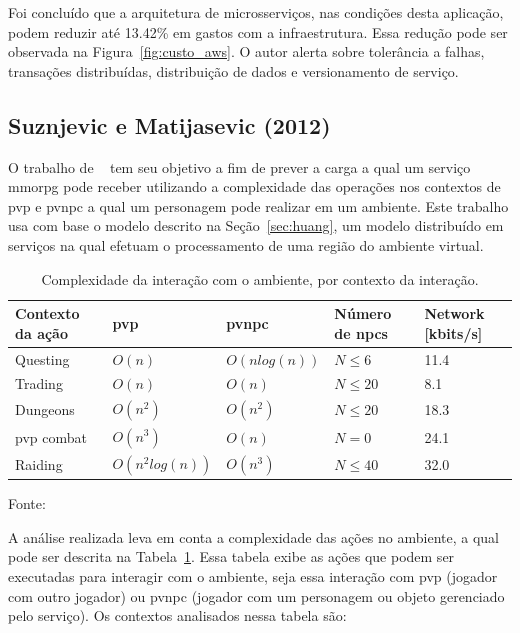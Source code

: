 Foi concluído que a arquitetura de microsserviços, nas condições desta aplicação, podem reduzir até 13.42\% em gastos com a infraestrutura.
%
Essa redução pode ser observada na Figura~\ref{fig:custo_aws}.
%
O autor alerta sobre tolerância a falhas, transações distribuídas, distribuição de dados e versionamento de serviço.


\subsection{Suznjevic e Matijasevic (2012)}



O trabalho de ~\cite{6374456} tem seu objetivo a fim de prever a carga a qual um serviço \ac{mmorpg} pode receber utilizando a complexidade das operações nos contextos de \ac{pvp} e \ac{pvnpc} a qual um personagem pode realizar em um ambiente.
%
Este trabalho usa com base o modelo descrito na Seção~\ref{sec:huang}, um modelo distribuído em serviços na qual efetuam o processamento de uma região do ambiente virtual.



\begin{table}[htb!]
\centering
\caption{Complexidade da interação com o ambiente, por contexto da interação.}
\label{tab:complexidade}
\begin{tabular}{|l|l|l|l|l|}
\hline
Contexto da ação        & \ac{pvp}           & \ac{pvnpc}              & Número de \acp{npc}    & Network {[}kbits/s{]} \\ \hline
Questing                & $O(n)$             & $O(n log(n))$           & $N \leq 6 $            & 11.4          \\ \hline
Trading                 & $O(n)$             & $O(n)$                  & $N \leq 20$            & 8.1           \\ \hline
Dungeons                & $O(n^2)$           & $O(n^2)$                & $N \leq 20$            & 18.3          \\ \hline
\ac{pvp} combat         & $O(n^3)$           & $O(n)$                  & $N = 0    $            & 24.1          \\ \hline
Raiding                 & $O(n^2 log(n))$    & $O(n^3)$                & $N \leq 40$            & 32.0          \\ \hline
\end{tabular}

Fonte:~\cite{6374456}
\end{table}


A análise realizada leva em conta a complexidade das ações no ambiente, a qual pode ser descrita na Tabela~\ref{tab:complexidade}.
%
Essa tabela exibe as ações que podem ser executadas para interagir com o ambiente, seja essa interação com \ac{pvp} (jogador com outro jogador) ou \ac{pvnpc} (jogador com um personagem ou objeto gerenciado pelo serviço).
%
Os contextos analisados nessa tabela são:


